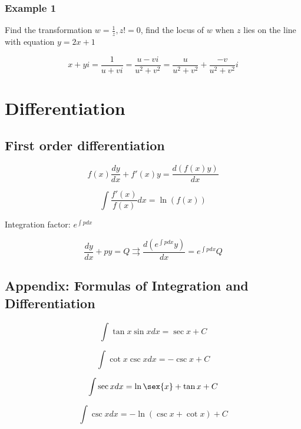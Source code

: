 \documentclass[a4paper,9pt]{scrartcl}
\begin{document}
    \subsubsection{Example 1}\label{subsubsec:example-1}
    Find the transformation $w = \frac{1}{z}, z != 0$, find the locus of $w$ when $z$ lies on the line with equation $y = 2x + 1$

    \begin{displaymath}
        x + yi = \frac{1}{u + vi} = \frac{u - vi}{u^2 + v^2} = \frac{u}{u^2+v^2} + \frac{-v}{u^2+v^2}i
    \end{displaymath}


    \section{Differentiation}\label{sec:differentiation}

    \subsection{First order differentiation}

    \begin{displaymath}
        f(x) \frac{dy}{dx} + f'(x) y = \frac{d(f(x) y )}{dx}
    \end{displaymath}

    \begin{displaymath}
        \int \frac{f'(x)}{f(x)} dx = \ln(f(x))
    \end{displaymath}

    Integration factor: $\boxed{e^{\int{p}dx}}$

    \begin{displaymath}
        \frac{dy}{dx}+py=Q \rightrightarrows \frac{d(\boxed{e^{\int{p}dx}}y)}{dx} = \boxed{e^{\int{p}dx}} Q
    \end{displaymath}

    \subsection{Appendix: Formulas of Integration and Differentiation}

    \begin{displaymath}
        \int{\tan{x}\sin{x}}dx = \sec{x} + C
    \end{displaymath}

    \begin{displaymath}
        \int{\cot{x}\csc{x}}dx = -\csc{x} + C
    \end{displaymath}

    \begin{displaymath}
        \int{\sec{x}}dx = \ln{\sex{x} + \tan{x}} + C
    \end{displaymath}

    \begin{displaymath}
        \int{\csc{x}}dx = -\ln({\csc{x} + \cot{x}}) + C
    \end{displaymath}
\end{document}

